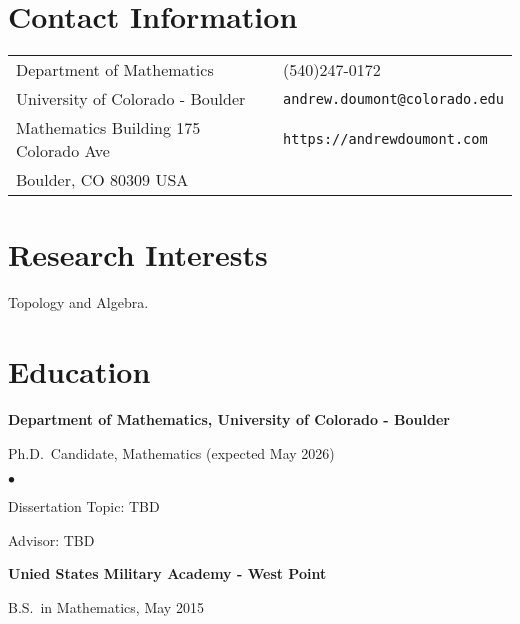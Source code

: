 \documentclass[margin,line,pifont,palatino,courier]{res}
\newenvironment{list1}{
  \begin{list}{\ding{113}}{%
      \setlength{\itemsep}{0in}
      \setlength{\parsep}{0in} \setlength{\parskip}{0in}
      \setlength{\topsep}{0in} \setlength{\partopsep}{0in}
      \setlength{\leftmargin}{0.17in}}}{\end{list}}
\newenvironment{list2}{
  \begin{list}{$\bullet$}{%
      \setlength{\itemsep}{0in}
      \setlength{\parsep}{0in} \setlength{\parskip}{0in}
      \setlength{\topsep}{0in} \setlength{\partopsep}{0in}
      \setlength{\leftmargin}{0.2in}}}{\end{list}}
\begin{document}

\begin{resume}

\section{\sc Contact Information}

\vspace{.05in}
\begin{tabular}{@{}p{2.75in}p{2in}}
Department of Mathematics  & (540)247-0172 \\
University of Colorado - Boulder                        & \verb+andrew.doumont@colorado.edu+\\
Mathematics Building 175 Colorado Ave                 & \verb+https://andrewdoumont.com+\\
Boulder, CO 80309 USA              & \\
\end{tabular}

\section{\sc Research Interests}
Topology and Algebra.

\section{\sc Education}

{\bf Department of Mathematics, University of Colorado - Boulder}\\
\vspace*{-.1in}
\begin{list1}
\item[] Ph.D.~Candidate, Mathematics (expected May 2026)

\begin{list2}
\vspace*{.05in}
\item Dissertation Topic:  TBD
\item Advisor: TBD
\end{list2}
\end{list1}

{\bf Unied States Military Academy - West Point}\\
\vspace*{-.1in}
\begin{list1}
\item[] B.S.~in Mathematics, May 2015


\end{list1}
\end{resume}
\end{document}
